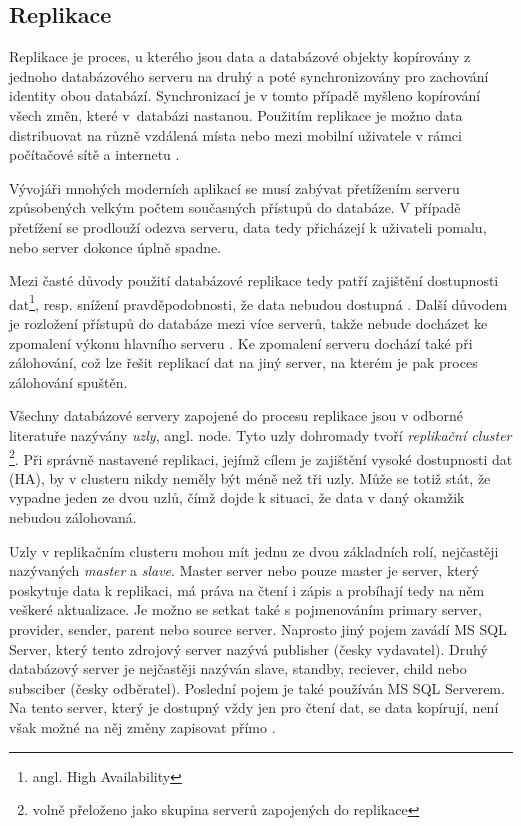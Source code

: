         \subsection{Replikace}
        \label{kReplikace}
Replikace je proces, u kterého jsou data a databázové objekty kopírovány z jednoho databázového serveru na druhý a poté synchronizovány pro zachování identity obou databází. Synchronizací je v tomto případě myšleno kopírování všech změn, které v~databázi nastanou. Použitím replikace je možno data distribuovat na různě vzdálená místa nebo mezi mobilní uživatele v rámci počítačové sítě a internetu \citep{Microsoft2013}.

Vývojáři mnohých moderních aplikací se musí zabývat přetížením serveru způsobených velkým počtem současných přístupů do databáze. V případě přetížení se prodlouží odezva serveru, data tedy přicházejí k uživateli pomalu, nebo server dokonce úplně spadne. 

Mezi časté důvody použití databázové replikace tedy patří zajištění dostupnosti dat\footnote{angl. High Availability}, resp. snížení pravděpodobnosti, že data nebudou dostupná \citep{ObeHsu2012}. Další důvodem je rozložení přístupů do databáze mezi více serverů, takže nebude docházet ke zpomalení výkonu hlavního serveru \citep{BellKindahlThalmann2010}. Ke zpomalení serveru dochází také při zálohování, což lze řešit replikací dat na jiný server, na kterém je pak proces zálohování spuštěn. 

Všechny databázové servery zapojené do procesu replikace jsou v odborné li\-te\-ra\-tu\-ře nazývány {\it uzly}, angl. node. Tyto uzly dohromady tvoří {\it replikační cluster} \footnote{volně přeloženo jako skupina serverů zapojených do replikace}. Při správně nastavené replikaci, jejímž cílem je zajištění vysoké dostupnosti dat (HA), by v clusteru nikdy neměly být méně než tři uzly. Může se totiž stát, že vypadne jeden ze dvou uzlů, čímž dojde k situaci, že data v daný okamžik nebudou zálohovaná. 

Uzly v replikačním clusteru mohou mít jednu ze dvou základních rolí, nejčastěji nazývaných {\it master} a {\it slave}. Master server nebo pouze master je server, který poskytuje data k replikaci, má práva na čtení i zápis a probíhají tedy na něm veškeré aktualizace. Je možno se setkat také s pojmenováním primary server, provider, sender, parent nebo source server. Naprosto jiný pojem zavádí MS SQL Server, který tento zdrojový server nazývá publisher (česky vydavatel). Druhý databázový server je nejčastěji nazýván slave, standby, reciever, child nebo subsciber (česky odběratel). Poslední pojem je také používán MS SQL Serverem. Na tento server, který je dostupný vždy jen pro čtení dat, se data kopírují, není však možné na něj změny zapisovat přímo \citep{RiggsKrossing2010}.

